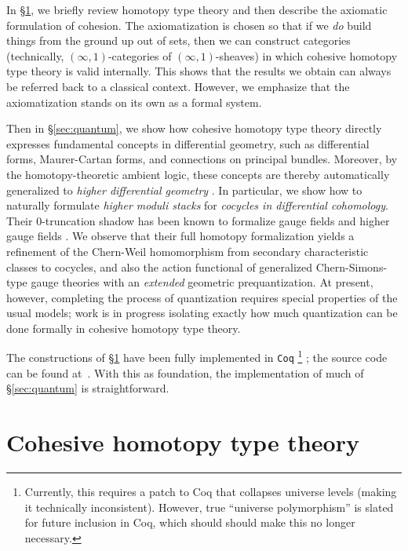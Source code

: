 \documentclass[copyright,12pt]{eptcs}
\newcommand{\io}{\ensuremath{(\infty,1)}}
\begin{document}

In \S\ref{sec:cohott}, we briefly review homotopy type theory and then describe the axiomatic formulation of cohesion.
The axiomatization is chosen so that if we \emph{do} build things from the ground up out of sets, then we can construct categories (technically, \io-categories of \io-sheaves) in which cohesive homotopy type theory is valid internally.
This shows that the results we obtain can always be referred back to a classical context.
However, we emphasize that the axiomatization stands on its own as a formal system.

Then in \S\ref{sec:quantum}, we show how cohesive homotopy type theory directly expresses
fundamental concepts in differential geometry, such as differential forms,
Maurer-Cartan forms, and connections on principal bundles.
Moreover, by the homotopy-theoretic ambient logic, these concepts are thereby automatically generalized to
\emph{higher differential geometry} \cite{NSS}. In particular,
we show how to naturally formulate
\emph{higher moduli stacks} for \emph{cocycles in differential cohomology}.
Their 0-truncation shadow has been known to
formalize gauge fields and higher gauge fields \cite{Freed}.
We observe that their full homotopy formalization yields a refinement of
the Chern-Weil homomorphism from secondary characteristic classes to
cocycles, and also the action functional of generalized
Chern-Simons-type gauge theories with an \emph{extended} geometric prequantization.
At present, however, completing the process of quantization requires special properties of the usual models; work is in progress isolating exactly how much quantization can be done formally in cohesive homotopy type theory.

The constructions of \S\ref{sec:cohott} have been fully implemented in {\tt Coq}%
\footnote{Currently, this requires a patch to Coq that collapses universe levels (making it technically inconsistent).  However, true ``universe polymorphism'' is slated for future inclusion in Coq, which should should make this no longer necessary.} \cite{Coq};
the source code can be found at~\cite{CohesiveCoq}.  With this as foundation, the implementation
of much of \S\ref{sec:quantum} is straightforward.


\section{Cohesive homotopy type theory}
\label{sec:cohott}
\end{document}
